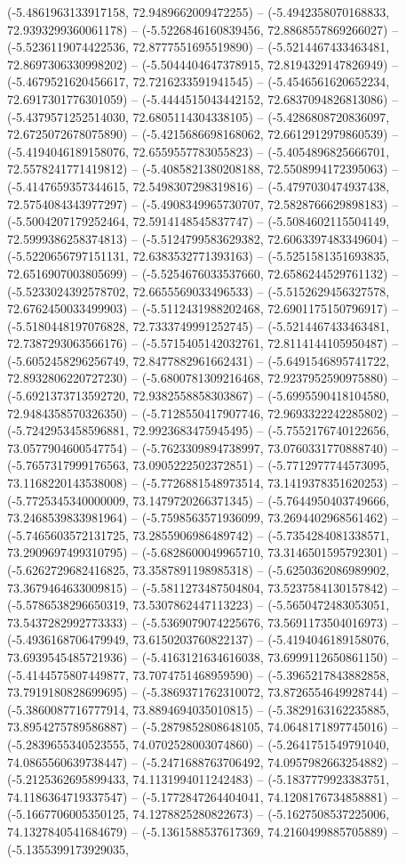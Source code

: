 (-5.4861963133917158, 72.9489662009472255) -- (-5.4942358070168833, 72.9393299360061178) -- (-5.5226846160839456, 72.8868557869266027) -- (-5.5236119074422536, 72.8777551695519890) -- (-5.5214467433463481, 72.8697306330998202) -- (-5.5044404647378915, 72.8194329147826949) -- (-5.4679521620456617, 72.7216233591941545) -- (-5.4546561620652234, 72.6917301776301059) -- (-5.4444515043442152, 72.6837094826813086) -- (-5.4379571252514030, 72.6805114304338105) -- (-5.4286808720836097, 72.6725072678075890) -- (-5.4215686698168062, 72.6612912979860539) -- (-5.4194046189158076, 72.6559557783055823) -- (-5.4054896825666701, 72.5578241771419812) -- (-5.4085821380208188, 72.5508994172395063) -- (-5.4147659357344615, 72.5498307298319816) -- (-5.4797030474937438, 72.5754084343977297) -- (-5.4908349965730707, 72.5828766629898183) -- (-5.5004207179252464, 72.5914148545837747) -- (-5.5084602115504149, 72.5999386258374813) -- (-5.5124799583629382, 72.6063397483349604) -- (-5.5220656797151131, 72.6383532771393163) -- (-5.5251581351693835, 72.6516907003805699) -- (-5.5254676033537660, 72.6586244529761132) -- (-5.5233024392578702, 72.6655569033496533) -- (-5.5152629456327578, 72.6762450033499903) -- (-5.5112431988202468, 72.6901175150796917) -- (-5.5180448197076828, 72.7333749991252745) -- (-5.5214467433463481, 72.7387293063566176) -- (-5.5715405142032761, 72.8114144105950487) -- (-5.6052458296256749, 72.8477882961662431) -- (-5.6491546895741722, 72.8932806220727230) -- (-5.6800781309216468, 72.9237952590975880) -- (-5.6921373713592720, 72.9382558858303867) -- (-5.6995590418104580, 72.9484358570326350) -- (-5.7128550417907746, 72.9693322242285802) -- (-5.7242953458596881, 72.9923683475945495) -- (-5.7552176740122656, 73.0577904600547754) -- (-5.7623309894738997, 73.0760331770888740) -- (-5.7657317999176563, 73.0905222502372851) -- (-5.7712977744573095, 73.1168220143538008) -- (-5.7726881548973514, 73.1419378351620253) -- (-5.7725345340000009, 73.1479720266371345) -- (-5.7644950403749666, 73.2468539833981964) -- (-5.7598563571936099, 73.2694402968561462) -- (-5.7465603572131725, 73.2855906986489742) -- (-5.7354284081338571, 73.2909697499310795) -- (-5.6828600049965710, 73.3146501595792301) -- (-5.6262729682416825, 73.3587891198985318) -- (-5.6250362086989902, 73.3679464633009815) -- (-5.5811273487504804, 73.5237584130157842) -- (-5.5786538296650319, 73.5307862447113223) -- (-5.5650472483053051, 73.5437282992773333) -- (-5.5369079074225676, 73.5691173504016973) -- (-5.4936168706479949, 73.6150203760822137) -- (-5.4194046189158076, 73.6939545485721936) -- (-5.4163121634616038, 73.6999112650861150) -- (-5.4144575807449877, 73.7074751468959590) -- (-5.3965217843882858, 73.7919180828699695) -- (-5.3869371762310072, 73.8726554649928744) -- (-5.3860087716777914, 73.8894694035010815) -- (-5.3829163162235885, 73.8954275789586887) -- (-5.2879852808648105, 74.0648171897745016) -- (-5.2839655340523555, 74.0702528003074860) -- (-5.2641751549791040, 74.0865560639738447) -- (-5.2471688763706492, 74.0957982663254882) -- (-5.2125362695899433, 74.1131994011242483) -- (-5.1837779923383751, 74.1186364719337547) -- (-5.1772847264404041, 74.1208176734858881) -- (-5.1667706005350125, 74.1278825280822673) -- (-5.1627508537225006, 74.1327840541684679) -- (-5.1361588537617369, 74.2160499885705889) -- (-5.1355399173929035, 
